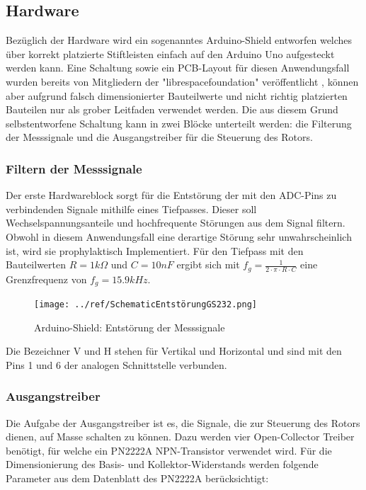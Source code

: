 \subsection{Hardware}
Bezüglich der Hardware wird ein sogenanntes Arduino-Shield entworfen welches über korrekt platzierte Stiftleisten einfach auf den Arduino Uno aufgesteckt werden kann. Eine Schaltung sowie ein PCB-Layout für diesen Anwendungsfall wurden bereits von Mitgliedern der "librespacefoundation"  veröffentlicht \cite{noauthor_librespacefoundation_nodate}, können aber aufgrund falsch dimensionierter Bauteilwerte und nicht richtig platzierten Bauteilen nur als grober Leitfaden verwendet werden. Die aus diesem Grund selbstentworfene Schaltung kann in zwei Blöcke unterteilt werden: die Filterung der Messsignale und die Ausgangstreiber für die Steuerung des Rotors.  

\subsubsection{Filtern der Messsignale}
Der erste Hardwareblock sorgt für die Entstörung der mit den ADC-Pins zu verbindenden Signale mithilfe eines Tiefpasses. Dieser soll Wechselspannungsanteile und hochfrequente Störungen aus dem Signal filtern. Obwohl in diesem Anwendungsfall eine derartige Störung sehr unwahrscheinlich ist, wird sie prophylaktisch Implementiert. Für den Tiefpass mit den Bauteilwerten $R=1k\Omega $ und $C=10nF$ ergibt sich mit ${f}_{g}=\frac{1}{2\cdot \pi \cdot R\cdot C}$ eine Grenzfrequenz von ${f}_{g}=15.9kHz$.

\begin{figure}[H]
	\centering
	\texttt{[image: ../ref/SchematicEntstörungGS232.png]}
	\label{fig:Schaltung_Entstörung_Arduino-Shield}
	\caption{Arduino-Shield: Entstörung der Messsignale}
\end{figure}

Die Bezeichner V und H stehen für Vertikal und Horizontal und sind mit den Pins 1 und 6 der analogen Schnittstelle verbunden.

\subsubsection{Ausgangstreiber}
Die Aufgabe der Ausgangstreiber ist es, die Signale, die zur Steuerung des Rotors dienen, auf Masse schalten zu können. Dazu werden vier Open-Collector Treiber benötigt, für welche ein PN2222A NPN-Transistor verwendet wird. Für die Dimensionierung des Basis- und Kollektor-Widerstands werden folgende Parameter aus dem Datenblatt des PN2222A \cite{noauthor_pn2222a_nodate} berücksichtigt: 

